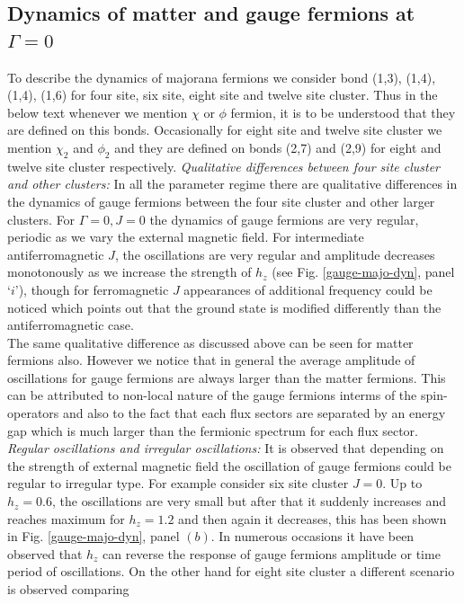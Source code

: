 \documentclass[aps,amsmath,twocolumn,amssymb,floatfix,showpacs,superscriptaddress,nofootinbib,longbibliography]{revtex4-1}
\begin{document}
\subsection{Dynamics of matter and gauge fermions at $\Gamma=0$}
To describe the dynamics of majorana fermions we consider bond (1,3), (1,4), (1,4), (1,6) for four site, six site, eight site and twelve site cluster. Thus in the below text whenever we mention $\chi$ or $\phi$ fermion, it is to be understood that they are defined on this bonds. Occasionally for eight site and twelve site cluster we mention $\chi_2$ and $\phi_2$
and they are defined on bonds (2,7) and (2,9) for eight and twelve site cluster respectively.
{\small {\it {Qualitative differences between four site cluster and other clusters:}}}
In all the parameter regime there are qualitative differences in the dynamics of gauge fermions between the four site cluster and other larger clusters. For $\Gamma=0, J=0$ the dynamics of gauge fermions are very regular, periodic as we vary the external magnetic field. For intermediate antiferromagnetic $J$, the oscillations are very regular and amplitude decreases monotonously as we increase the strength of $h_z$ (see Fig. \ref{gauge-majo-dyn}, panel `$i$'),  though for ferromagnetic $J$ appearances of additional frequency could be noticed which points out that the ground state is modified differently than the antiferromagnetic case.  \\
\indent
The same qualitative difference as discussed above can be seen for matter fermions also. However we notice that in general the average amplitude of oscillations for gauge fermions are always larger than the matter fermions. This can be attributed to non-local nature of the gauge fermions interms of the spin-operators and also to the fact that each flux sectors are separated by an energy gap which is much larger than the fermionic spectrum for each flux sector. \\
\indent
{\small {\it {Regular oscillations and irregular oscillations:}}}
It is observed that depending on the strength of external magnetic field the oscillation of gauge fermions could be regular to irregular type. For example consider six site cluster $J=0$. Up to $h_z=0.6$, the oscillations are very small but after that it suddenly increases\cite{yamada-2020} and reaches maximum for $h_z=1.2$ and then again it decreases, this has been shown in Fig. \ref{gauge-majo-dyn}, panel $(b)$. In numerous occasions it have been observed that $h_z$ can reverse the response of gauge fermions amplitude or time period  of oscillations.  On the other hand for eight site cluster a different scenario is observed comparing
\end{document}

